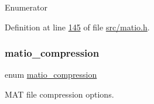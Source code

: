 \begin{DoxyEnumFields}{Enumerator}
\end{DoxyEnumFields}


Definition at line \hyperlink{src_2matio_8h_source_l00145}{145} of file \hyperlink{src_2matio_8h_source}{src/matio.\+h}.

\mbox{\label{group___m_a_t_ga768c318af97bd2567758ecb001ceb7f4}} 
\subsubsection{\texorpdfstring{matio\+\_\+compression}{matio\_compression}\hspace{0.1cm}{\footnotesize\ttfamily [2/2]}}
{\footnotesize\ttfamily enum \hyperlink{group___m_a_t_ga768c318af97bd2567758ecb001ceb7f4}{matio\+\_\+compression}}



M\+AT file compression options. 

